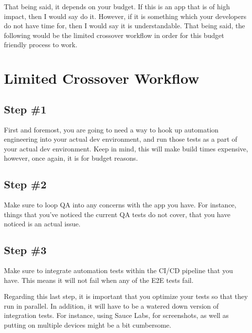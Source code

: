 That being said, it depends on your budget. If this is an app that is of high
impact, then I would say do it. However, if it is something which your developers
do not have time for, then I would say it is understandable. That being said,
the following would be the limited crossover workflow in order for this budget
friendly process to work.

\section{Limited Crossover Workflow}
\subsection{Step \#1}

First and foremost, you are going to need a way to hook up automation engineering
into your actual dev environment, and run those tests as a part of your actual
dev environment. Keep in mind, this will make build times expensive, however,
once again, it is for budget reasons.

\subsection{Step \#2}
Make sure to loop QA into any concerns with the app you have. For instance,
things that you've noticed the current QA tests do not cover, that you have
noticed is an actual issue.

\subsection{Step \#3}
Make sure to integrate automation tests within the CI/CD pipeline that you have.
This means it will not fail when any of the E2E tests fail.

Regarding this last step, it is important that you optimize your tests so
that they run in parallel. In addition, it will have to be a watered down
version of integration tests. For instance, using Sauce Labs, for screenshots,
as well as putting on multiple devices might be a bit cumbersome.
